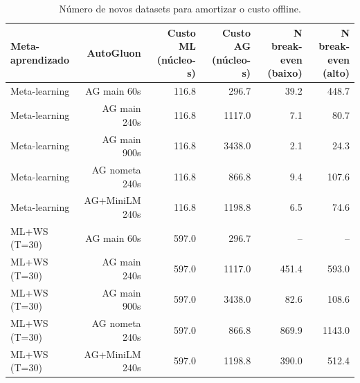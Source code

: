\begin{table}[htbp]
\centering
\caption{Número de novos datasets para amortizar o custo offline.}
\label{tab:automl-breakeven}
\begin{tabular}{lrrrrr}
\toprule
Meta-aprendizado & AutoGluon & Custo ML (núcleo-s) & Custo AG (núcleo-s) & N break-even (baixo) & N break-even (alto) \\
\midrule
Meta-learning & AG main 60s & 116.8 & 296.7 & 39.2 & 448.7 \\
Meta-learning & AG main 240s & 116.8 & 1117.0 & 7.1 & 80.7 \\
Meta-learning & AG main 900s & 116.8 & 3438.0 & 2.1 & 24.3 \\
Meta-learning & AG nometa 240s & 116.8 & 866.8 & 9.4 & 107.6 \\
Meta-learning & AG+MiniLM 240s & 116.8 & 1198.8 & 6.5 & 74.6 \\
ML+WS (T=30) & AG main 60s & 597.0 & 296.7 & -- & -- \\
ML+WS (T=30) & AG main 240s & 597.0 & 1117.0 & 451.4 & 593.0 \\
ML+WS (T=30) & AG main 900s & 597.0 & 3438.0 & 82.6 & 108.6 \\
ML+WS (T=30) & AG nometa 240s & 597.0 & 866.8 & 869.9 & 1143.0 \\
ML+WS (T=30) & AG+MiniLM 240s & 597.0 & 1198.8 & 390.0 & 512.4 \\
\bottomrule
\end{tabular}
\end{table}
